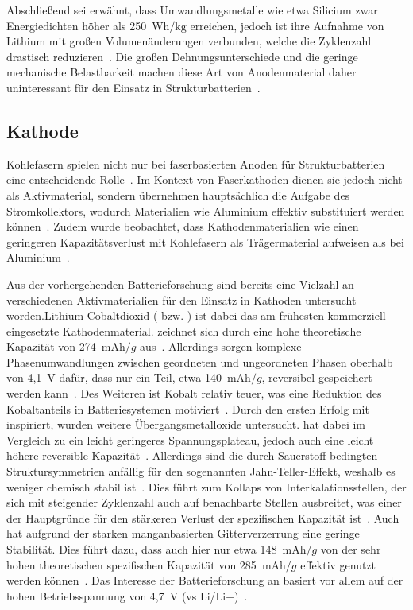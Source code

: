 

Abschließend sei erwähnt, dass Umwandlungsmetalle wie etwa Silicium zwar Energiedichten höher als 250~$\si{\watt \hour \per \kg}$ erreichen, jedoch ist ihre Aufnahme von Lithium mit großen Volumenänderungen verbunden, welche die Zyklenzahl drastisch reduzieren~\cite{Gayet2009, Pereira2019}. Die großen Dehnungsunterschiede und die geringe mechanische Belastbarkeit machen diese Art von Anodenmaterial daher uninteressant für den Einsatz in Strukturbatterien~\cite{Javaid2018}.

\subsection{Kathode}

Kohlefasern spielen nicht nur bei faserbasierten Anoden für Strukturbatterien eine entscheidende Rolle~\cite{Ye2024}. Im Kontext von Faserkathoden dienen sie jedoch nicht als Aktivmaterial, sondern übernehmen hauptsächlich die Aufgabe des Stromkollektors, wodurch Materialien wie Aluminium effektiv substituiert werden können~\cite{Martha2012}. Zudem wurde beobachtet, dass Kathodenmaterialien wie  einen geringeren Kapazitätsverlust mit Kohlefasern als Trägermaterial aufweisen als bei Aluminium~\cite{Martha2011}.

Aus der vorhergehenden Batterieforschung sind bereits eine Vielzahl an verschiedenen Aktivmaterialien für den Einsatz in Kathoden untersucht worden.Lithium-Cobaltdioxid ( bzw. ) ist dabei das am frühesten kommerziell eingesetzte Kathodenmaterial\cite{Amatucci1996}.  zeichnet sich durch eine hohe theoretische Kapazität von 274~$\si{\milli \ampere \hour \per g}$ aus~\cite{Ren2023}. Allerdings sorgen komplexe Phasenumwandlungen zwischen geordneten und ungeordneten Phasen oberhalb von 4,1~V dafür, dass nur ein Teil, etwa 140~$\si{\milli \ampere \hour \per g}$, reversibel gespeichert werden kann~\cite{Vetter2005, Liu2018}. Des Weiteren ist Kobalt relativ teuer, was eine Reduktion des Kobaltanteils in Batteriesystemen motiviert~\cite{Ren2023}.
Durch den ersten Erfolg mit  inspiriert, wurden weitere Übergangsmetalloxide untersucht.  hat dabei im Vergleich zu  ein leicht geringeres Spannungsplateau, jedoch auch eine leicht höhere reversible Kapazität~\cite{Ren2023}. Allerdings sind die durch Sauerstoff bedingten Struktursymmetrien anfällig für den sogenannten Jahn-Teller-Effekt, weshalb es weniger chemisch stabil ist~\cite{Kalyani2005}. Dies führt zum Kollaps von Interkalationsstellen, der sich mit steigender Zyklenzahl auch auf benachbarte Stellen ausbreitet, was einer der Hauptgründe für den stärkeren Verlust der spezifischen Kapazität ist~\cite{Vaelikangas2020}. Auch  hat aufgrund der starken manganbasierten Gitterverzerrung eine geringe Stabilität. Dies führt dazu, dass auch hier nur etwa 148~$\si{\milli \ampere \hour \per g}$ von der sehr hohen theoretischen spezifischen Kapazität von 285~$\si{\milli \ampere \hour \per g}$ effektiv genutzt werden können~\cite{Chen2014}. Das Interesse der Batterieforschung an  basiert vor allem auf der hohen Betriebsspannung von 4,7~V (vs Li/Li+)~\cite{Liang2020,Yu2021,Liang2020a}.


